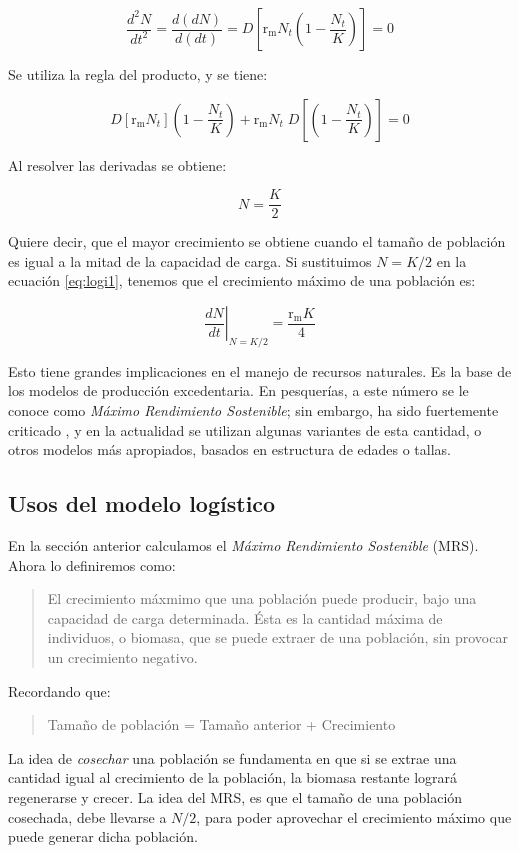 \documentclass[12pt,letterpaper,]{book}
\begin{document}
\[
\frac{d^2N}{dt^2}=\frac{d(dN)}{d(dt)}=D\left[ \mathrm{r_m}N_t\left(1-\frac{N_t}{K}\right)\right]=0
\]

Se utiliza la regla del producto, y se tiene:

\[
D\left[ \mathrm{r_m}N_t \right]\left(1-\frac{N_t}{K}\right) + \mathrm{r_m}N_t\; D\left[\left(1-\frac{N_t}{K}\right)\right]=0
\]

Al resolver las derivadas se obtiene:

\[
N = \frac{K}{2}
\]

Quiere decir, que el mayor crecimiento se obtiene cuando el tamaño de
población es igual a la mitad de la capacidad de carga. Si sustituimos
\(N = K/2\) en la ecuación \eqref{eq:logi1}, tenemos que el crecimiento
máximo de una población es:

\[
\left. \frac{dN}{dt}\right|_{N = K/2} = \frac{\mathrm{r_m}K}{4}
\]

Esto tiene grandes implicaciones en el manejo de recursos naturales. Es
la base de los modelos de producción excedentaria. En pesquerías, a este
número se le conoce como \emph{Máximo Rendimiento Sostenible}; sin
embargo, ha sido fuertemente criticado \citep{Larkin1977}, y en la
actualidad se utilizan algunas variantes de esta cantidad, o otros
modelos más apropiados, basados en estructura de edades o tallas.

\subsection{Usos del modelo logístico}\label{usos-del-modelo-logistico}

En la sección anterior calculamos el \emph{Máximo Rendimiento
Sostenible} (MRS). Ahora lo definiremos como:

\begin{quote}
El crecimiento máxmimo que una población puede producir, bajo una
capacidad de carga determinada. Ésta es la cantidad máxima de
individuos, o biomasa, que se puede extraer de una población, sin
provocar un crecimiento negativo.
\end{quote}

Recordando que:

\begin{quote}
Tamaño de población = Tamaño anterior + Crecimiento
\end{quote}

La idea de \emph{cosechar} una población se fundamenta en que si se
extrae una cantidad igual al crecimiento de la población, la biomasa
restante logrará regenerarse y crecer. La idea del MRS, es que el tamaño
de una población cosechada, debe llevarse a \(N/2\), para poder
aprovechar el crecimiento máximo que puede generar dicha población.
\end{document}
